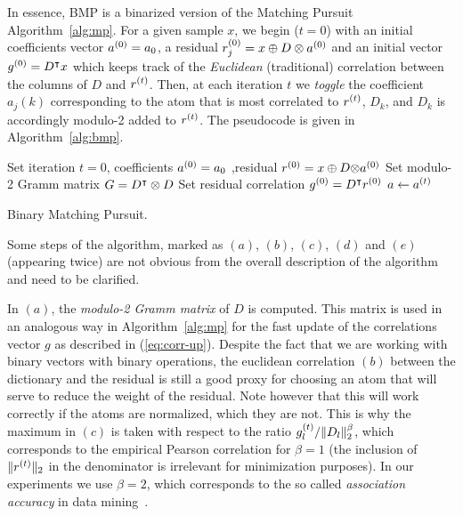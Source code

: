 \documentclass[twocolumn]{IEEEtran}
\theoremstyle{definition}
\def\transp{^\intercal}
\newcommand{\refeq}[1]{(\ref{#1})}
\begin{document}
In essence, BMP is a binarized version of the Matching Pursuit Algorithm~\ref{alg:mp}. For a given sample $x$, we begin ($t=0$) with an initial coefficients vector $a^{(0)}=a_0$, a residual $r^{(0)}_j=x \oplus D \otimes a^{(0)}$ and an initial vector $g\iter{0}=D\transp x$ which keeps track of the \emph{Euclidean} (traditional)  correlation between the columns of $D$ and $r^{(t)}$. Then, at each iteration $t$ we \emph{toggle} the coefficient $a_j(k)$ corresponding to the atom that is most correlated to $r^{(t)}$, $D_{k}$, and $D_k$ is accordingly modulo-2 added to $r^{(t)}$. The pseudocode is given in Algorithm~\ref{alg:bmp}. 
%
\begin{algorithm}[ht]
Set iteration $t=0$, coefficients $a^{(0)}=a_0$ ,residual $r^{(0)}=x \oplus D{\otimes}a^{(0)}$\;
Set modulo-2 Gramm matrix $G = D\transp \mprod D$
Set residual correlation $g\iter{0}=D\transp{r\iter{0}}$
\Return $a \leftarrow a^{(t)}$ \;
\caption{\label{alg:bmp} Binary Matching Pursuit.}
\end{algorithm}

Some steps of the algorithm, marked as $(a)$, $(b)$, $(c)$, $(d)$ and $(e)$ (appearing twice) are not obvious from the overall description of the algorithm and need to be clarified. 

In $(a)$, the \emph{modulo-2 Gramm matrix} of $D$ is computed. This matrix is used in an analogous way in Algorithm~\ref{alg:mp} for the fast update of the correlations vector $g$ as described in \refeq{eq:corr-up}. Despite the fact that we are working with binary vectors with binary operations, the euclidean correlation $(b)$ between the dictionary and the residual  is still a good proxy for choosing an atom that will serve to reduce the weight of the residual. Note however that this will work correctly if the atoms are normalized, which they are not. This is why 
the maximum in $(c)$ is taken with respect to the ratio $g^{(t)}_l / \|D_l\|_2^\beta$, which corresponds to the empirical Pearson correlation for $\beta=1$ (the inclusion of $\|r^{(t)}\|_2$ in the denominator is irrelevant for minimization purposes). In our experiments we use $\beta=2$, which corresponds to the so called \emph{association accuracy} in data mining~\cite{association-accuracy}. 
\end{document}
